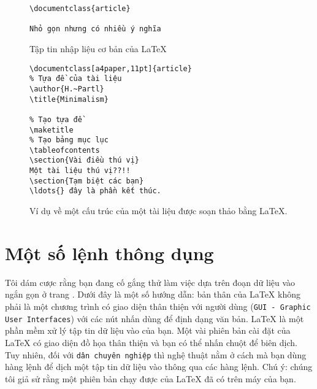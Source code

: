\begin{figure}[!bp]
\begin{lined}{6cm}
\begin{verbatim}
\documentclass{article}

Nhỏ gọn nhưng có nhiều ý nghĩa

\end{verbatim}
\end{lined}
\caption{Tập tin nhập liệu cơ bản của \LaTeX{}} \label{mini}
\end{figure}

\begin{figure}[!bp]
\begin{lined}{10cm}
\begin{verbatim}
\documentclass[a4paper,11pt]{article}
% Tựa đề của tài liệu
\author{H.~Partl}
\title{Minimalism}

% Tạo tựa đề
\maketitle
% Tạo bảng mục lục
\tableofcontents
\section{Vài điều thú vị}
Một tài liệu thú vị??!!
\section{Tạm biệt các bạn}
\ldots{} đây là phần kết thúc.

\end{verbatim}
\end{lined}
\caption{Ví dụ về một cấu trúc của một tài liệu được soạn thảo
bằng \LaTeX{}.} \label{document}
\end{figure}

\section{Một số lệnh thông dụng}
Tôi dám cược rằng bạn đang cố gắng thử làm việc dựa trên đoạn dữ liệu
vào ngắn gọn ở trang \pageref{mini}. Dưới đây là một số hướng dẫn:
bản thân của \LaTeX{} không phải là một chương trình có giao diện
thân thiện với người dùng (\texttt{GUI - Graphic User Interfaces}) với các nút nhấn dùng để định dạng văn bản. \LaTeX{} là một phần mềm xử lý tập tin dữ liệu
vào của bạn. Một vài phiên bản cài đặt của \LaTeX{} có giao diện
đồ họa thân thiện và bạn có thể nhấn chuột để biên dịch. Tuy
nhiên, đối với \texttt{dân chuyên nghiệp} thì nghệ thuật nằm ở
cách mà bạn dùng hàng lệnh để dịch một tập tin dữ liệu vào thông
qua các hàng lệnh. Chú ý: chúng tôi giả sử rằng một phiên bản chạy
được của \LaTeX{} đã có trên máy của bạn.

